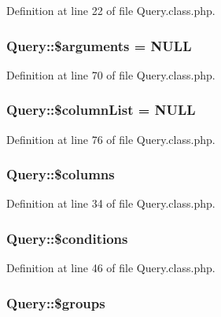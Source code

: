Definition at line 22 of file Query.\-class.\-php.

\hypertarget{classQuery_a49166e3c5f5198e4b899c8ee47b6258a}{
\subsubsection[{\$arguments}]{\setlength{\rightskip}{0pt plus 5cm}Query\-::\$arguments = N\-U\-L\-L}}\label{classQuery_a49166e3c5f5198e4b899c8ee47b6258a}


Definition at line 70 of file Query.\-class.\-php.

\hypertarget{classQuery_a113bcdfdc3bf6acef684a06ae324334a}{
\subsubsection[{\$column\-List}]{\setlength{\rightskip}{0pt plus 5cm}Query\-::\$column\-List = N\-U\-L\-L}}\label{classQuery_a113bcdfdc3bf6acef684a06ae324334a}


Definition at line 76 of file Query.\-class.\-php.

\hypertarget{classQuery_a7cf97254cbd55fdbb9e149723498d9ba}{
\subsubsection[{\$columns}]{\setlength{\rightskip}{0pt plus 5cm}Query\-::\$columns}}\label{classQuery_a7cf97254cbd55fdbb9e149723498d9ba}


Definition at line 34 of file Query.\-class.\-php.

\hypertarget{classQuery_a5c71d786a82b2cc014968d2553b6bc9d}{
\subsubsection[{\$conditions}]{\setlength{\rightskip}{0pt plus 5cm}Query\-::\$conditions}}\label{classQuery_a5c71d786a82b2cc014968d2553b6bc9d}


Definition at line 46 of file Query.\-class.\-php.

\hypertarget{classQuery_a76992fbfae6d700e65dfde28911a2475}{
\subsubsection[{\$groups}]{\setlength{\rightskip}{0pt plus 5cm}Query\-::\$groups}}\label{classQuery_a76992fbfae6d700e65dfde28911a2475}


